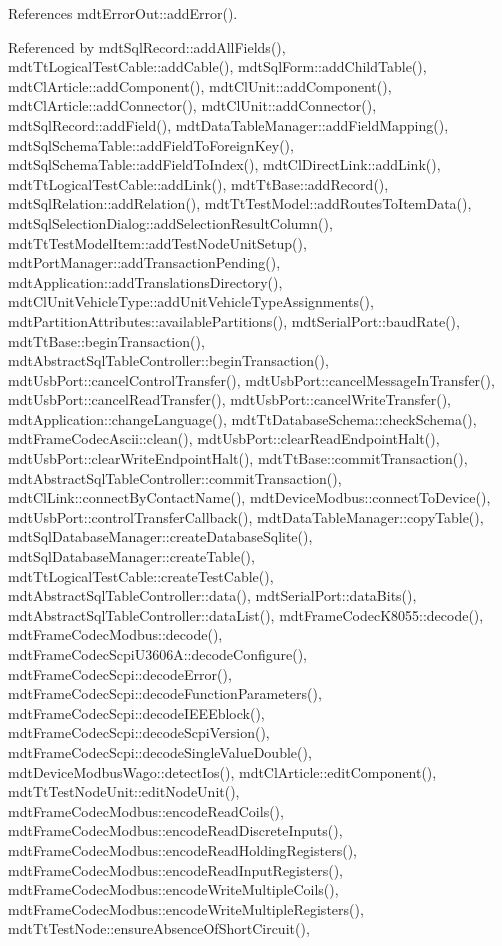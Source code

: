 References mdt\-Error\-Out\-::add\-Error().



Referenced by mdt\-Sql\-Record\-::add\-All\-Fields(), mdt\-Tt\-Logical\-Test\-Cable\-::add\-Cable(), mdt\-Sql\-Form\-::add\-Child\-Table(), mdt\-Cl\-Article\-::add\-Component(), mdt\-Cl\-Unit\-::add\-Component(), mdt\-Cl\-Article\-::add\-Connector(), mdt\-Cl\-Unit\-::add\-Connector(), mdt\-Sql\-Record\-::add\-Field(), mdt\-Data\-Table\-Manager\-::add\-Field\-Mapping(), mdt\-Sql\-Schema\-Table\-::add\-Field\-To\-Foreign\-Key(), mdt\-Sql\-Schema\-Table\-::add\-Field\-To\-Index(), mdt\-Cl\-Direct\-Link\-::add\-Link(), mdt\-Tt\-Logical\-Test\-Cable\-::add\-Link(), mdt\-Tt\-Base\-::add\-Record(), mdt\-Sql\-Relation\-::add\-Relation(), mdt\-Tt\-Test\-Model\-::add\-Routes\-To\-Item\-Data(), mdt\-Sql\-Selection\-Dialog\-::add\-Selection\-Result\-Column(), mdt\-Tt\-Test\-Model\-Item\-::add\-Test\-Node\-Unit\-Setup(), mdt\-Port\-Manager\-::add\-Transaction\-Pending(), mdt\-Application\-::add\-Translations\-Directory(), mdt\-Cl\-Unit\-Vehicle\-Type\-::add\-Unit\-Vehicle\-Type\-Assignments(), mdt\-Partition\-Attributes\-::available\-Partitions(), mdt\-Serial\-Port\-::baud\-Rate(), mdt\-Tt\-Base\-::begin\-Transaction(), mdt\-Abstract\-Sql\-Table\-Controller\-::begin\-Transaction(), mdt\-Usb\-Port\-::cancel\-Control\-Transfer(), mdt\-Usb\-Port\-::cancel\-Message\-In\-Transfer(), mdt\-Usb\-Port\-::cancel\-Read\-Transfer(), mdt\-Usb\-Port\-::cancel\-Write\-Transfer(), mdt\-Application\-::change\-Language(), mdt\-Tt\-Database\-Schema\-::check\-Schema(), mdt\-Frame\-Codec\-Ascii\-::clean(), mdt\-Usb\-Port\-::clear\-Read\-Endpoint\-Halt(), mdt\-Usb\-Port\-::clear\-Write\-Endpoint\-Halt(), mdt\-Tt\-Base\-::commit\-Transaction(), mdt\-Abstract\-Sql\-Table\-Controller\-::commit\-Transaction(), mdt\-Cl\-Link\-::connect\-By\-Contact\-Name(), mdt\-Device\-Modbus\-::connect\-To\-Device(), mdt\-Usb\-Port\-::control\-Transfer\-Callback(), mdt\-Data\-Table\-Manager\-::copy\-Table(), mdt\-Sql\-Database\-Manager\-::create\-Database\-Sqlite(), mdt\-Sql\-Database\-Manager\-::create\-Table(), mdt\-Tt\-Logical\-Test\-Cable\-::create\-Test\-Cable(), mdt\-Abstract\-Sql\-Table\-Controller\-::data(), mdt\-Serial\-Port\-::data\-Bits(), mdt\-Abstract\-Sql\-Table\-Controller\-::data\-List(), mdt\-Frame\-Codec\-K8055\-::decode(), mdt\-Frame\-Codec\-Modbus\-::decode(), mdt\-Frame\-Codec\-Scpi\-U3606\-A\-::decode\-Configure(), mdt\-Frame\-Codec\-Scpi\-::decode\-Error(), mdt\-Frame\-Codec\-Scpi\-::decode\-Function\-Parameters(), mdt\-Frame\-Codec\-Scpi\-::decode\-I\-E\-E\-Eblock(), mdt\-Frame\-Codec\-Scpi\-::decode\-Scpi\-Version(), mdt\-Frame\-Codec\-Scpi\-::decode\-Single\-Value\-Double(), mdt\-Device\-Modbus\-Wago\-::detect\-Ios(), mdt\-Cl\-Article\-::edit\-Component(), mdt\-Tt\-Test\-Node\-Unit\-::edit\-Node\-Unit(), mdt\-Frame\-Codec\-Modbus\-::encode\-Read\-Coils(), mdt\-Frame\-Codec\-Modbus\-::encode\-Read\-Discrete\-Inputs(), mdt\-Frame\-Codec\-Modbus\-::encode\-Read\-Holding\-Registers(), mdt\-Frame\-Codec\-Modbus\-::encode\-Read\-Input\-Registers(), mdt\-Frame\-Codec\-Modbus\-::encode\-Write\-Multiple\-Coils(), mdt\-Frame\-Codec\-Modbus\-::encode\-Write\-Multiple\-Registers(), mdt\-Tt\-Test\-Node\-::ensure\-Absence\-Of\-Short\-Circuit(), 